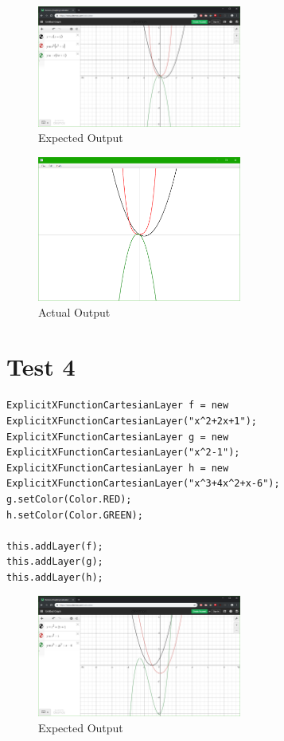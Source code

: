 \documentclass[../../../main.tex]{subfiles}
\begin{document}
\begin{figure}[H]
	\centering
	\includegraphics[width=0.6\textwidth]{tests/expected3}
	\caption{Expected Output}
\end{figure}

\begin{figure}[H]
	\centering
	\includegraphics[width=0.6\textwidth]{tests/actual3}
	\caption{Actual Output}
\end{figure}
\newpage

\section{Test 4}
\begin{verbatim}
ExplicitXFunctionCartesianLayer f = new ExplicitXFunctionCartesianLayer("x^2+2x+1");
ExplicitXFunctionCartesianLayer g = new ExplicitXFunctionCartesianLayer("x^2-1");
ExplicitXFunctionCartesianLayer h = new ExplicitXFunctionCartesianLayer("x^3+4x^2+x-6");
g.setColor(Color.RED);
h.setColor(Color.GREEN);

this.addLayer(f);
this.addLayer(g);
this.addLayer(h);
\end{verbatim}

\begin{figure}[H]
	\centering
	\includegraphics[width=0.6\textwidth]{tests/expected4}
	\caption{Expected Output}
\end{figure}
\end{document}
